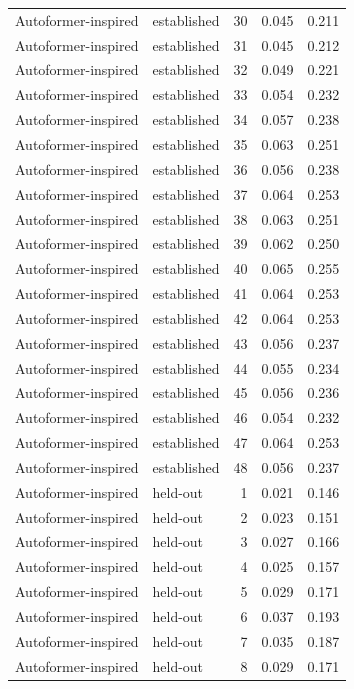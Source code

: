 \begin{tabular}{llrrr}
Autoformer-inspired & established & 30 & 0.045 & 0.211 \\
Autoformer-inspired & established & 31 & 0.045 & 0.212 \\
Autoformer-inspired & established & 32 & 0.049 & 0.221 \\
Autoformer-inspired & established & 33 & 0.054 & 0.232 \\
Autoformer-inspired & established & 34 & 0.057 & 0.238 \\
Autoformer-inspired & established & 35 & 0.063 & 0.251 \\
Autoformer-inspired & established & 36 & 0.056 & 0.238 \\
Autoformer-inspired & established & 37 & 0.064 & 0.253 \\
Autoformer-inspired & established & 38 & 0.063 & 0.251 \\
Autoformer-inspired & established & 39 & 0.062 & 0.250 \\
Autoformer-inspired & established & 40 & 0.065 & 0.255 \\
Autoformer-inspired & established & 41 & 0.064 & 0.253 \\
Autoformer-inspired & established & 42 & 0.064 & 0.253 \\
Autoformer-inspired & established & 43 & 0.056 & 0.237 \\
Autoformer-inspired & established & 44 & 0.055 & 0.234 \\
Autoformer-inspired & established & 45 & 0.056 & 0.236 \\
Autoformer-inspired & established & 46 & 0.054 & 0.232 \\
Autoformer-inspired & established & 47 & 0.064 & 0.253 \\
Autoformer-inspired & established & 48 & 0.056 & 0.237 \\
Autoformer-inspired & held-out & 1 & 0.021 & 0.146 \\
Autoformer-inspired & held-out & 2 & 0.023 & 0.151 \\
Autoformer-inspired & held-out & 3 & 0.027 & 0.166 \\
Autoformer-inspired & held-out & 4 & 0.025 & 0.157 \\
Autoformer-inspired & held-out & 5 & 0.029 & 0.171 \\
Autoformer-inspired & held-out & 6 & 0.037 & 0.193 \\
Autoformer-inspired & held-out & 7 & 0.035 & 0.187 \\
Autoformer-inspired & held-out & 8 & 0.029 & 0.171 \\

\end{tabular}
